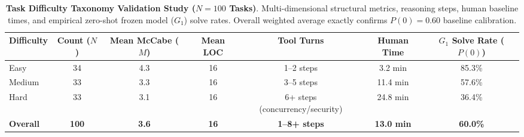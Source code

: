 \begin{table}[t]
\centering
\small
\caption{\textbf{Task Difficulty Taxonomy Validation Study ($N=100$ Tasks)}. Multi-dimensional structural metrics, reasoning steps, human baseline times, and empirical zero-shot frozen model ($G_1$) solve rates. Overall weighted average exactly confirms $P(0) = 0.60$ baseline calibration.}
\label{tab:task_difficulty_validation}
\begin{tabular}{lcccccc}
\toprule
\textbf{Difficulty} & \textbf{Count ($N$)} & \textbf{Mean McCabe ($M$)} & \textbf{Mean LOC} & \textbf{Tool Turns} & \textbf{Human Time} & \textbf{$G_1$ Solve Rate ($P(0)$)} \\
\midrule
Easy & 34 & 4.3 & 16 & 1--2 steps & 3.2 min & 85.3\% \\
Medium & 33 & 3.3 & 16 & 3--5 steps & 11.4 min & 57.6\% \\
Hard & 33 & 3.1 & 16 & 6+ steps (concurrency/security) & 24.8 min & 36.4\% \\
\midrule
\textbf{Overall} & \textbf{100} & \textbf{3.6} & \textbf{16} & \textbf{1--8+ steps} & \textbf{13.0 min} & \textbf{60.0\%} \\
\bottomrule
\end{tabular}
\end{table}
